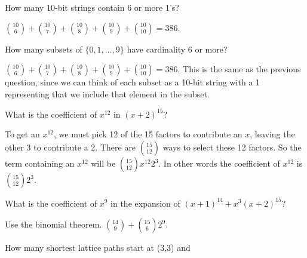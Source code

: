 \begin{questions}
\question How many 10-bit strings contain 6 or more 1's?

  \begin{answer}
    ${10 \choose 6} + {10\choose 7} + {10\choose 8} + {10 \choose 9} + {10\choose 10} = 386$.
  \end{answer}

\question How many subsets of $\{0,1,\ldots, 9\}$ have cardinality 6 or more?

	\begin{answer}
	${10 \choose 6} + {10\choose 7} + {10\choose 8} + {10 \choose 9} + {10\choose 10} = 386$.  This is the same as the previous question, since we can think of each subset as a 10-bit string with a 1 representing that we include that element in the subset.
	\end{answer}



\question What is the coefficient of $x^{12}$ in $(x+2)^{15}$?

	\begin{answer}
		To get an $x^{12}$, we must pick 12 of the 15 factors to contribute an $x$, leaving the other 3 to contribute a 2.  There are ${15 \choose 12}$ ways to select these 12 factors.  So the term containing an $x^{12}$ will be ${15 \choose 12}x^{12}2^{3}$.  In other words the coefficient of $x^{12}$ is ${15\choose 12}2^3$.
	\end{answer}



\question What is the coefficient of $x^9$ in the expansion of $(x+1)^{14} + x^3(x+2)^{15}$?

  \begin{answer}
    Use the binomial theorem.  ${14\choose 9} + {15 \choose 6}2^9$.
  \end{answer}





\question How many shortest lattice paths start at (3,3) and


\end{questions}
